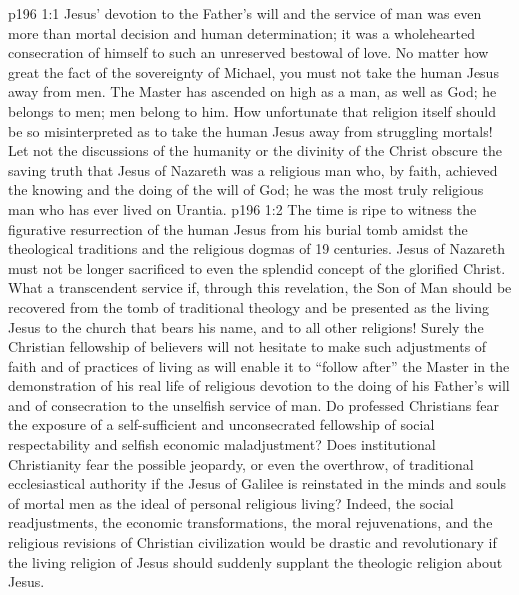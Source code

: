 \vs p196 1:1 Jesus’ devotion to the Father’s will and the service of man was even more than mortal decision and human determination; it was a wholehearted consecration of himself to such an unreserved bestowal of love. No matter how great the fact of the sovereignty of Michael, you must not take the human Jesus away from men. The Master has ascended on high as a man, as well as God; he belongs to men; men belong to him. How unfortunate that religion itself should be so misinterpreted as to take the human Jesus away from struggling mortals! Let not the discussions of the humanity or the divinity of the Christ obscure the saving truth that Jesus of Nazareth was a religious man who, by faith, achieved the knowing and the doing of the will of God; he was the most truly religious man who has ever lived on Urantia.
\vs p196 1:2 The time is ripe to witness the figurative resurrection of the human Jesus from his burial tomb amidst the theological traditions and the religious dogmas of 19 centuries. Jesus of Nazareth must not be longer sacrificed to even the splendid concept of the glorified Christ. What a transcendent service if, through this revelation, the Son of Man should be recovered from the tomb of traditional theology and be presented as the living Jesus to the church that bears his name, and to all other religions! Surely the Christian fellowship of believers will not hesitate to make such adjustments of faith and of practices of living as will enable it to “follow after” the Master in the demonstration of his real life of religious devotion to the doing of his Father’s will and of consecration to the unselfish service of man. Do professed Christians fear the exposure of a self\hyp{}sufficient and unconsecrated fellowship of social respectability and selfish economic maladjustment? Does institutional Christianity fear the possible jeopardy, or even the overthrow, of traditional ecclesiastical authority if the Jesus of Galilee is reinstated in the minds and souls of mortal men as the ideal of personal religious living? Indeed, the social readjustments, the economic transformations, the moral rejuvenations, and the religious revisions of Christian civilization would be drastic and revolutionary if the living religion of Jesus should suddenly supplant the theologic religion about Jesus.
